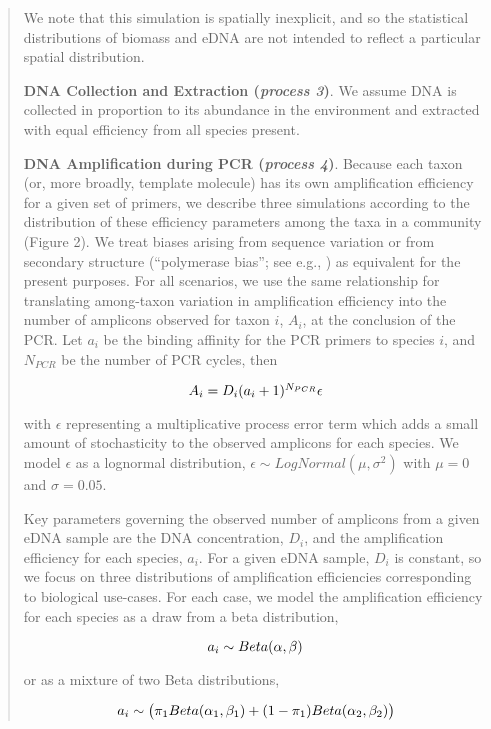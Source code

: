 \documentclass[fleqn,11pt,lineno]{wlscirep}
\begin{document}
\begin{quote}
		We note that this simulation is spatially inexplicit, and so the statistical distributions of biomass and eDNA are not intended to reflect a particular spatial distribution.
		
		
\textbf{DNA Collection and Extraction (\textit{process 3})}. We assume DNA is collected in proportion to its abundance in the environment and extracted with equal efficiency from all species present.
				

\textbf{DNA Amplification during PCR (\textit{process 4})}.  Because each taxon (or, more broadly, template molecule) has its own amplification efficiency for a given set of primers, we describe three simulations according to the distribution of these efficiency parameters among the taxa in a community (Figure 2). We treat biases arising from sequence variation or from secondary structure (``polymerase bias''; see e.g., \cite{braukmann2019}) as equivalent for the present purposes. For all scenarios, we use the same relationship for translating among-taxon variation in amplification efficiency into the number of amplicons observed for taxon $i$, $A_i$, at the conclusion of the PCR. Let $a_i$ be the binding affinity for the PCR primers to species $i$, and $N_{PCR}$ be the number of PCR cycles, then

\begin{equation}	
			$$A_{i} = D_{i}(a_{i}+1)^{N_{PCR}} \epsilon $$ 
\end{equation}	

with $\epsilon$ representing a multiplicative process error term which adds a small amount of stochasticity to the observed amplicons for each species. We model $\epsilon$ as a lognormal distribution, $\epsilon \sim LogNormal(\mu,\sigma^2)$ with $\mu = 0$ and $\sigma = 0.05$.

Key parameters governing the observed number of amplicons from a given eDNA sample are the DNA concentration, $D_i$, and the amplification efficiency for each species, $a_i$. For a given eDNA sample, $D_i$ is constant, so we focus on three distributions of amplification efficiencies corresponding to biological use-cases. For each case, we model the amplification efficiency for each species as a draw from a beta distribution,

\begin{equation}		
		$$	a_i \sim Beta(\alpha, \beta) $$
\end{equation}		
		
or as a mixture of two Beta distributions, 		

\begin{equation}	
			$$a_i \sim \big( \pi_1 Beta(\alpha_1, \beta_1) + (1-\pi_1)Beta(\alpha_2, \beta_2) \big)$$
\end{equation}	


\end{quote}
\end{document}
